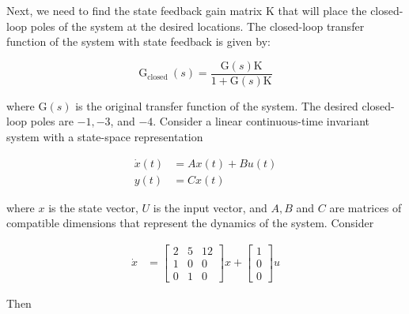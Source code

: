 \documentclass[main.tex]{subfiles}
\begin{document}
\begin{enumerate}
\begin{enumerate}
        Next, we need to find the state feedback gain matrix $\mathrm{K}$ that will place the closed-loop poles of the system at the desired locations. The closed-loop transfer function of the system with state feedback is given by:
        
        $$
        \mathrm{G}_{\text {closed }}(s)=\frac{\mathrm{G}(s) \mathrm{K}}{1+\mathrm{G}(s) \mathrm{K}}
        $$
        
        where $\mathrm{G}(s)$ is the original transfer function of the system. The desired closed-loop poles are $-1,-3$, and $-4$. Consider a linear continuous-time invariant system with a state-space representation
        
        $$
        \begin{aligned}
        \dot{x}(t) & =A x(t)+B u(t)\\
        y(t) & =C x(t)
        \end{aligned}
        $$
        
        where $x$ is the state vector, $U$ is the input vector, and $A, B$ and $C$ are matrices of compatible dimensions that represent the dynamics of the system. Consider
        
        $$
        \begin{aligned}
        \dot{x} &= \left[\begin{array}{ccc}
        2 & 5 & 12 \\
        1 & 0 & 0 \\
        0 & 1 & 0
        \end{array}\right] x+\left[\begin{array}{l}
        1 \\
        0 \\
        0
        \end{array}\right] u
        \end{aligned}
        $$
        
        Then


\end{enumerate}
\end{enumerate}
\end{document}
